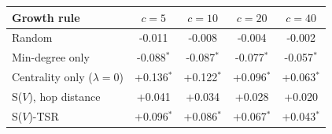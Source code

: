 \begin{tabular}{lcccc}
\toprule
Growth rule & $c{=}5$ & $c{=}10$ & $c{=}20$ & $c{=}40$ \\
\midrule
Random & -0.011 & -0.008 & -0.004 & -0.002 \\
Min-degree only & -0.088$^{*}$ & -0.087$^{*}$ & -0.077$^{*}$ & -0.057$^{*}$ \\
Centrality only ($\lambda{=}0$) & +0.136$^{*}$ & +0.122$^{*}$ & +0.096$^{*}$ & +0.063$^{*}$ \\
S($V$), hop distance & +0.041 & +0.034 & +0.028 & +0.020 \\
S($V$)-TSR & +0.096$^{*}$ & +0.086$^{*}$ & +0.067$^{*}$ & +0.043$^{*}$ \\
\bottomrule
\end{tabular}
